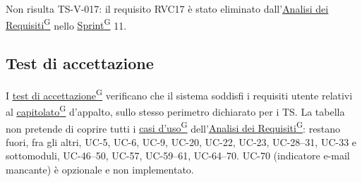 \documentclass[a4paper,12pt]{article}
\providecommand{\glslink}[2]{\href{https://alittlebyte-19.github.io/Documentazione/glossario.html\#gls-#1}{\underline{#2}\textsuperscript{\scriptsize G}}}
\begin{document}
\noindent Non risulta TS-V-017: il requisito RVC17 è stato eliminato dall'\glslink{analisi-dei-requisiti-adr}{Analisi dei Requisiti} nello \glslink{sprint}{Sprint} 11.

\subsection{Test di accettazione}
I \glslink{test-di-accettazione}{test di accettazione} verificano che il sistema soddisfi i requisiti utente relativi al \glslink{capitolato}{capitolato} d'appalto, sullo stesso perimetro dichiarato per i TS. La tabella non pretende di coprire tutti i \glslink{caso-d-uso-uc}{casi d'uso} dell'\glslink{analisi-dei-requisiti-adr}{Analisi dei Requisiti}: restano fuori, fra gli altri, UC-5, UC-6, UC-9, UC-20, UC-22, UC-23, UC-28--31, UC-33 e sottomoduli, UC-46--50, UC-57, UC-59--61, UC-64--70. UC-70 (indicatore e-mail mancante) è opzionale e non implementato.
\end{document}
